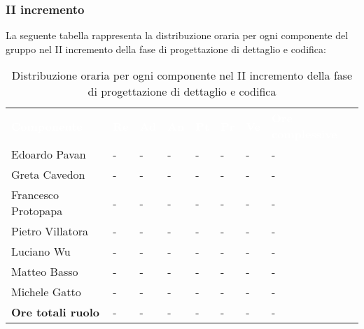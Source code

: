\subsubsection{II incremento}
La seguente tabella rappresenta la distribuzione oraria per ogni componente del gruppo nel II incremento della fase di progettazione di dettaglio e codifica:
\begin{table}[!htbp]
\begin{center}
\renewcommand{\arraystretch}{1.25}
\begin{tabular}{ m{}<{\centering}  m{}<{\centering} m{}<{\centering} m{}<{\centering}  m{}<{\centering}  m{}<{\centering}  m{}<{\centering}  m{}<{\centering}   }
	\rowcolor{darkblue}
	\textcolor{white}{\textbf{Componente}} &\textcolor{white}{\textbf{Re}}&\textcolor{white}{\textbf{Ad}}&\textcolor{white}{\textbf{An}}&\textcolor{white}{\textbf{Pt}}&\textcolor{white}{\textbf{Pr}}&\textcolor{white}{\textbf{Ve}}&\textcolor{white}{\textbf{Ore complessive}}\\ 

	Edoardo Pavan & - & - & - & - & - & - & -\\	

	Greta Cavedon & - & - & - & - & - & - & -\\
	
	Francesco Protopapa & - & - & - & - & - & - & -\\
	
	Pietro Villatora & - & - & - & - & - & - & -\\
	
	Luciano Wu & - & - & - & - & - & - & -\\
	
	Matteo Basso & - & - & - & - & - & - & -\\
	
	Michele Gatto & - & - & - & - & - & - & -\\
	
	\textbf{Ore totali ruolo} & - & - & - & - & - & - & -\\

\end{tabular}
\caption{Distribuzione oraria per ogni componente nel II incremento della fase di progettazione di dettaglio e codifica}
\end{center}
\end{table}

